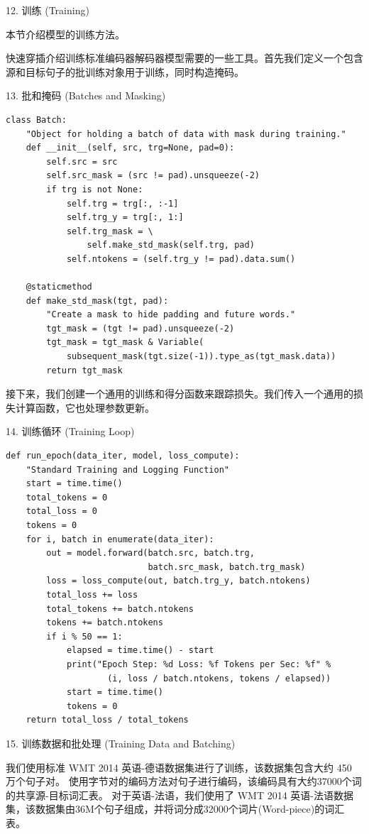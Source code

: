 12. 训练 (Training)

本节介绍模型的训练方法。

快速穿插介绍训练标准编码器解码器模型需要的一些工具。首先我们定义一个包含源和目标句子的批训练对象用于训练，同时构造掩码。

13. 批和掩码 (Batches and Masking)

\begin{Verbatim}
class Batch:
    "Object for holding a batch of data with mask during training."
    def __init__(self, src, trg=None, pad=0):
        self.src = src
        self.src_mask = (src != pad).unsqueeze(-2)
        if trg is not None:
            self.trg = trg[:, :-1]
            self.trg_y = trg[:, 1:]
            self.trg_mask = \
                self.make_std_mask(self.trg, pad)
            self.ntokens = (self.trg_y != pad).data.sum()
    
    @staticmethod
    def make_std_mask(tgt, pad):
        "Create a mask to hide padding and future words."
        tgt_mask = (tgt != pad).unsqueeze(-2)
        tgt_mask = tgt_mask & Variable(
            subsequent_mask(tgt.size(-1)).type_as(tgt_mask.data))
        return tgt_mask
\end{Verbatim}

接下来，我们创建一个通用的训练和得分函数来跟踪损失。我们传入一个通用的损失计算函数，它也处理参数更新。

14. 训练循环 (Training Loop)

\begin{Verbatim}
def run_epoch(data_iter, model, loss_compute):
    "Standard Training and Logging Function"
    start = time.time()
    total_tokens = 0
    total_loss = 0
    tokens = 0
    for i, batch in enumerate(data_iter):
        out = model.forward(batch.src, batch.trg, 
                            batch.src_mask, batch.trg_mask)
        loss = loss_compute(out, batch.trg_y, batch.ntokens)
        total_loss += loss
        total_tokens += batch.ntokens
        tokens += batch.ntokens
        if i % 50 == 1:
            elapsed = time.time() - start
            print("Epoch Step: %d Loss: %f Tokens per Sec: %f" %
                    (i, loss / batch.ntokens, tokens / elapsed))
            start = time.time()
            tokens = 0
    return total_loss / total_tokens
\end{Verbatim}

15. 训练数据和批处理 (Training Data and Batching)

我们使用标准 WMT 2014 英语-德语数据集进行了训练，该数据集包含大约 450 万个句子对。 使用字节对的编码方法对句子进行编码，该编码具有大约37000个词的共享源-目标词汇表。 对于英语-法语，我们使用了 WMT 2014 英语-法语数据集，该数据集由36M个句子组成，并将词分成32000个词片(Word-piece)的词汇表。

